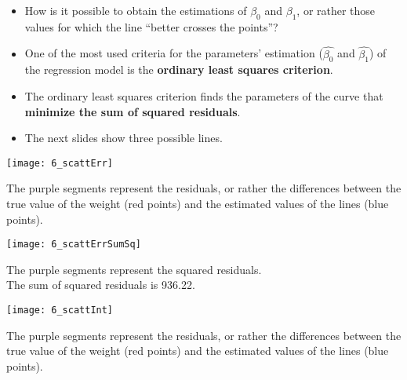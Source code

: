 \begin{frame}
  \vspace{0.25cm}
  \begin{itemize}
    \item How is it possible to obtain the estimations of $ \beta_0 $ and $ \beta_1 $, or rather those values for which the line ``better crosses the points''?
    \vspace{0.75cm}
    \item One of the most used criteria for the parameters' estimation ($ \hat{\beta_0} $ and $ \hat{\beta_1} $) of the regression model is the \textbf{ordinary least squares criterion}.
    \vspace{0.5cm}
    \item The ordinary least squares criterion finds the parameters of the curve that \textbf{minimize the sum of squared residuals}.
    \vspace{0.75cm}
    \item The next slides show three possible lines.
  \end{itemize}
\end{frame}

\begin{frame}
  \begin{center}
    \texttt{[image: 6\_scattErr]}
  \end{center}
  \vspace{-0.4cm}
  \begin{small}
    The purple segments represent the residuals, or rather the differences between the true value of the weight (red points) and the estimated values of the lines (blue points).
  \end{small}
\end{frame}

\begin{frame}
  \begin{center}
    \texttt{[image: 6\_scattErrSumSq]}
  \end{center}
  \vspace{-0.4cm}
  \begin{small}
    The purple segments represent the squared residuals. \\
    The sum of squared residuals is 936.22.
  \end{small}
\end{frame}

\begin{frame}
  \begin{center}
    \texttt{[image: 6\_scattInt]}
  \end{center}
  \vspace{-0.4cm}
  \begin{small}
    The purple segments represent the residuals, or rather the differences between the true value of the weight (red points) and the estimated values of the lines (blue points).
  \end{small}
\end{frame}

